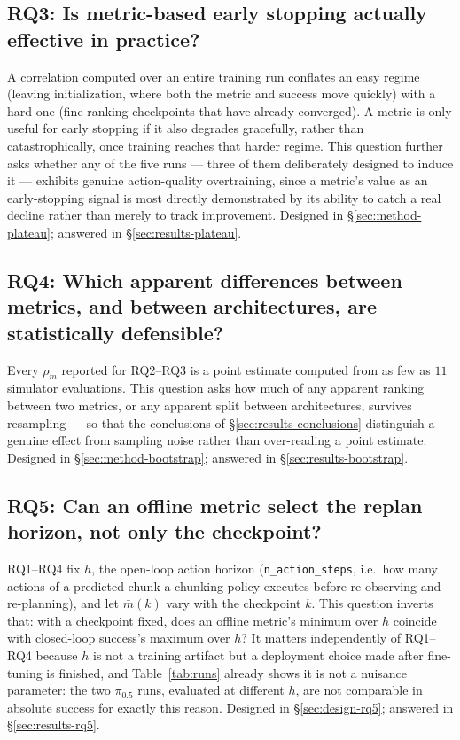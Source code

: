\documentclass[english,12pt,a4paper,pdftex,elec,utf8]{aaltothesis}
\begin{document}
\subsection{RQ3: Is metric-based early stopping actually effective in practice?}
\label{sec:rq3}

A correlation computed over an entire training run conflates an easy regime (leaving initialization, where both the metric and success move quickly) with a hard one (fine-ranking checkpoints that have already converged). A metric is only useful for early stopping if it also degrades gracefully, rather than catastrophically, once training reaches that harder regime. This question further asks whether any of the five runs --- three of them deliberately designed to induce it --- exhibits genuine action-quality overtraining, since a metric's value as an early-stopping signal is most directly demonstrated by its ability to catch a real decline rather than merely to track improvement. Designed in \S\ref{sec:method-plateau}; answered in \S\ref{sec:results-plateau}.

\subsection{RQ4: Which apparent differences between metrics, and between architectures, are statistically defensible?}
\label{sec:rq4}

Every $\rho_m$ reported for RQ2--RQ3 is a point estimate computed from as few as $11$ simulator evaluations. This question asks how much of any apparent ranking between two metrics, or any apparent split between architectures, survives resampling --- so that the conclusions of \S\ref{sec:results-conclusions} distinguish a genuine effect from sampling noise rather than over-reading a point estimate. Designed in \S\ref{sec:method-bootstrap}; answered in \S\ref{sec:results-bootstrap}.

\subsection{RQ5: Can an offline metric select the replan horizon, not only the checkpoint?}
\label{sec:rq5}

RQ1--RQ4 fix $h$, the open-loop action horizon (\texttt{n\_action\_steps}, i.e.\ how many actions of a predicted chunk a chunking policy executes before re-observing and re-planning), and let $\bar m(k)$ vary with the checkpoint $k$. This question inverts that: with a checkpoint fixed, does an offline metric's minimum over $h$ coincide with closed-loop success's maximum over $h$? It matters independently of RQ1--RQ4 because $h$ is not a training artifact but a deployment choice made after fine-tuning is finished, and Table~\ref{tab:runs} already shows it is not a nuisance parameter: the two $\pi_{0.5}$ runs, evaluated at different $h$, are not comparable in absolute success for exactly this reason. Designed in \S\ref{sec:design-rq5}; answered in \S\ref{sec:results-rq5}.
\end{document}
